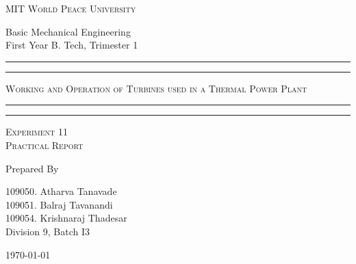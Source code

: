 \documentclass[11pt]{article}
\begin{document}
	
	\begin{titlepage} 
		\centering 
		
		
		\huge\textsc{
			MIT World Peace University
		}\\
	
		\vspace{0.75\baselineskip} %
		
		\LARGE{
			Basic Mechanical Engineering\\
			First Year B. Tech, Trimester 1
		}
		
		\vfill %
		
		
		\rule{\textwidth}{1.6pt}\vspace*{-\baselineskip}\vspace*{2pt}
		\rule{\textwidth}{0.6pt}
		\vspace{0.4\baselineskip} %
		
		
		
		\huge{\textsc{
				Working and Operation of Turbines used in a Thermal Power Plant
			}} \\
		
		
		
		\vspace{0.5\baselineskip} %
		\rule{\textwidth}{0.6pt}\vspace*{-\baselineskip}\vspace*{2.8pt}
		\rule{\textwidth}{1.6pt}
		
		\vspace{1\baselineskip} %

			
		\LARGE\textsc{
			Experiment 11\\Practical Report
		} %
		\vfill
		
		
		Prepared By
		\vspace{0.5\baselineskip} %
		
		\Large{
			109050. Atharva Tanavade \\
			109051. Balraj Tavanandi \\
			109054. Krishnaraj Thadesar \\
			Division 9, Batch I3
		}
		
		
		\vspace{0.5\baselineskip} %
		\today

	\end{titlepage}
\end{document}
